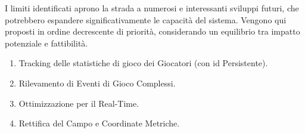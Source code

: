 \documentclass[12pt,a4paper,openright,twoside]{book}
\begin{document}
I limiti identificati aprono la strada a numerosi e interessanti
sviluppi futuri, che potrebbero espandere significativamente le
capacità del sistema. 
Vengono qui proposti in ordine decrescente di priorità, 
considerando un equilibrio tra impatto potenziale e fattibilità.

\begin{enumerate}
  \item Tracking delle statistiche di gioco dei 
  Giocatori (con \ac{id} Persistente).
  \item Rilevamento di Eventi di Gioco Complessi.
  \item Ottimizzazione per il Real-Time.
  \item Rettifica del Campo e Coordinate Metriche.
\end{enumerate}


% 



\backmatter

\printbibliography

\end{document}
